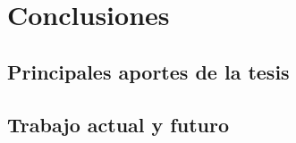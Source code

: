  \chapter{Conclusiones}
		
	\section{Principales aportes de la tesis} 
		

	\section{Trabajo actual y futuro} 